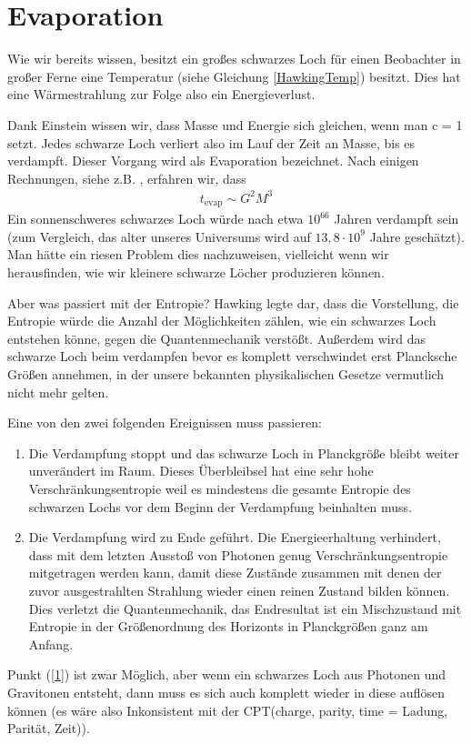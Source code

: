 \documentclass[ngerman]{scrartcl}
\begin{document}
\FloatBarrier
\section{Evaporation} \label{evaporation}

Wie wir bereits wissen, besitzt ein großes schwarzes Loch für einen Beobachter in großer Ferne eine Temperatur (siehe Gleichung \eqref{HawkingTemp}) besitzt. Dies hat eine Wärmestrahlung zur Folge also ein Energieverlust.

Dank Einstein wissen wir, dass Masse und Energie sich gleichen, wenn man c = 1 setzt. Jedes schwarze Loch verliert also im Lauf der Zeit an Masse, bis es verdampft. Dieser Vorgang wird als Evaporation bezeichnet. Nach einigen Rechnungen, siehe z.B. \cite{JerusalemsLectures}, erfahren wir, dass
	\begin{align}
		t_{\text{evap}} \sim G^2 M^3
	\end{align} 
Ein sonnenschweres schwarzes Loch würde nach etwa $10^{66}$ Jahren verdampft sein (zum Vergleich, das alter unseres Universums wird auf $13,8 \cdot 10^{9}$ Jahre geschätzt). Man hätte ein riesen Problem dies nachzuweisen, vielleicht wenn wir herausfinden, wie wir kleinere schwarze Löcher produzieren können. 

Aber was passiert mit der Entropie?
Hawking \cite{BreakdownGravitationalCollapse} legte dar, dass die Vorstellung, die Entropie würde die Anzahl der Möglichkeiten zählen, wie ein schwarzes Loch entstehen könne, gegen die Quantenmechanik verstößt.
Außerdem wird das schwarze Loch beim verdampfen bevor es komplett verschwindet erst Plancksche Größen annehmen, in der unsere bekannten physikalischen Gesetze vermutlich nicht mehr gelten. 

Eine von den zwei folgenden Ereignissen muss passieren:
	\begin{enumerate}[(1)]
		\item Die Verdampfung stoppt und das schwarze Loch in Planckgröße bleibt weiter unverändert im Raum. Dieses Überbleibsel hat eine sehr hohe Verschränkungsentropie weil es mindestens die gesamte Entropie des schwarzen Lochs vor dem Beginn der Verdampfung beinhalten muss. \label{1}
		
		\item Die Verdampfung wird zu Ende geführt. Die Energieerhaltung verhindert, dass mit dem letzten Ausstoß von Photonen genug Verschränkungsentropie mitgetragen werden kann, damit diese Zustände zusammen mit denen der zuvor ausgestrahlten Strahlung wieder einen reinen Zustand bilden können. Dies verletzt die Quantenmechanik, das Endresultat ist ein Mischzustand mit Entropie in der Größenordnung des Horizonts in Planckgrößen ganz am Anfang.  \label{2}
	\end{enumerate}
Punkt (\ref{1}) ist zwar Möglich, aber wenn ein schwarzes Loch aus Photonen und Gravitonen entsteht, dann muss es sich auch komplett wieder in diese auflösen können (es wäre also Inkonsistent mit der CPT(charge, parity, time = Ladung, Parität, Zeit)).
\end{document}
